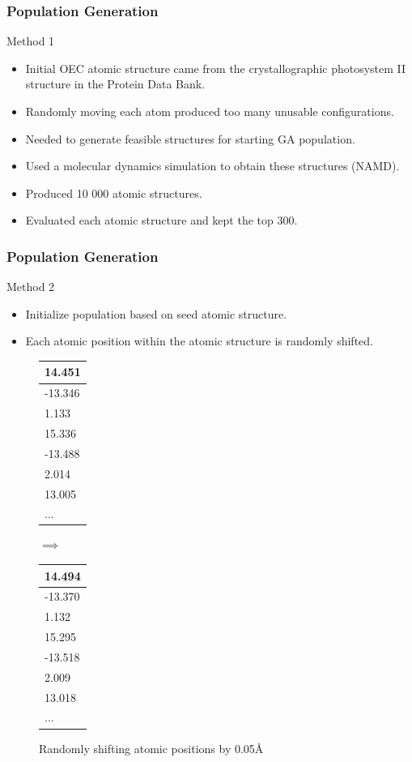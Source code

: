 \documentclass[10pt]{beamer}
\begin{document}
\begin{frame}
	\frametitle{Population Generation}

	Method 1

	\begin{itemize}
		\item Initial OEC atomic structure came from the crystallographic photosystem II structure in the Protein Data Bank.
		\item Randomly moving each atom produced too many unusable configurations.
		\item Needed to generate feasible structures for starting GA population.
		\item Used a molecular dynamics simulation to obtain these structures (NAMD).
		\item Produced 10 000 atomic structures.
		\item Evaluated each atomic structure and kept the top 300.
	\end{itemize}
\end{frame}

\begin{frame}
	\frametitle{Population Generation}

	Method 2

	\begin{itemize}
		\item Initialize population based on seed atomic structure.
		\item Each atomic position within the atomic structure is randomly shifted.
	\end{itemize}

	\begin{figure}
		\centering
		\begin{tabular}{ | l | }
			\hline
			14.451 \\ \hline
			-13.346 \\ \hline
			1.133 \\ \hline
			15.336 \\ \hline
			-13.488 \\ \hline
			2.014 \\ \hline
			13.005 \\ \hline
			... \\ \hline
		\end{tabular}
		\qquad$\implies$\qquad
		\begin{tabular}{ | l | }
			\hline
			14.494 \\ \hline
			-13.370 \\ \hline
			1.132 \\ \hline
			15.295 \\ \hline
			-13.518 \\ \hline
			2.009 \\ \hline
			13.018 \\ \hline
			... \\ \hline
		\end{tabular}
		\caption{Randomly shifting atomic positions by 0.05\AA}
		\label{fig:random-shift}
	\end{figure}

\end{frame}
\end{document}
